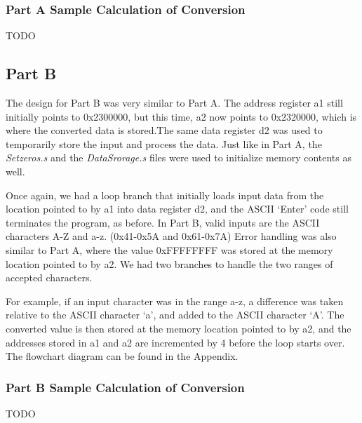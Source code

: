 \documentclass[letterpaper]{article}
\begin{document}

    \subsubsection{Part A Sample Calculation of Conversion}
      TODO

  \subsection{Part B}
    The design for Part B was very similar to Part A. The address register a1 still
    initially points to 0x2300000, but this time, a2 now points to 0x2320000, which is
    where the converted data is stored.The same data register d2 was used to temporarily
    store the input and process the data. Just like in Part A, the \textit{Setzeros.s} and the \textit{DataSrorage.s} files
    were used to initialize memory contents as well.

    Once again, we had a loop branch that initially loads input data from the location
    pointed to by a1 into data register d2, and the ASCII `Enter' code still terminates
    the program, as before. In Part B, valid inputs are the ASCII characters A-Z and a-z.
    (0x41-0x5A and 0x61-0x7A)
    Error handling was also similar to Part A, where the value 0xFFFFFFFF was stored at the
    memory location pointed to by a2. We had two branches to handle the two ranges of accepted
    characters.

    For example, if an input character was in the range a-z, a difference was taken
    relative to the ASCII character `a', and added to the ASCII character `A'. The
    converted value is then stored at the memory location pointed to by a2, and
    the addresses stored in a1 and a2 are incremented by 4 before the loop
    starts over. The flowchart diagram can be found in the Appendix.


    \subsubsection{Part B Sample Calculation of Conversion}
      TODO
\end{document}
